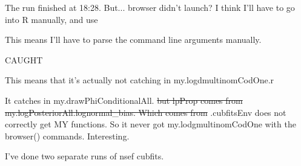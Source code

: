 The run finished at 18:28. But... browser didn't launch? I think I'll have to go into R manually, and use



This means I'll have to parse the command line arguments manually.


CAUGHT



This means that it's actually not catching in my.logdmultinomCodOne.r

It catches in my.drawPhiConditionalAll. \sout{but lpProp comes from my.logPosteriorAll.lognormal\_bias. Which comes from} .cubfitsEnv does not correctly get MY functions. So it never got my.lodgmultinomCodOne with the browser() commands. Interesting.

I've done two separate runs of nsef cubfits.

